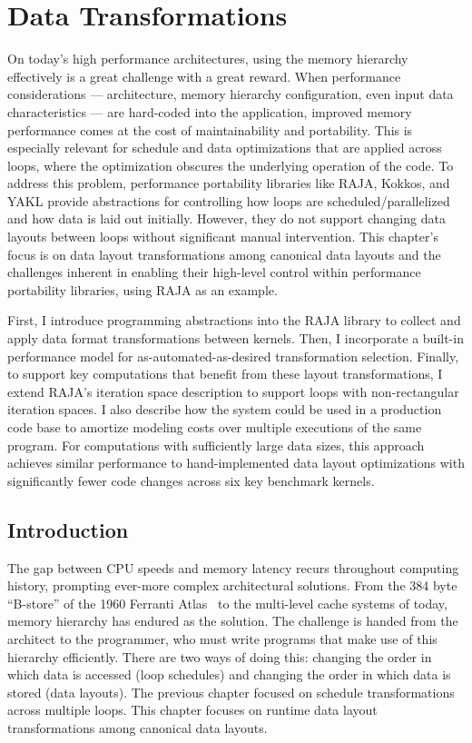 \chapter{Data Transformations}\label{chap:FormatDecisions}

On today's high performance architectures, using the memory hierarchy effectively is a great challenge with a great reward.
When performance considerations --- architecture, memory hierarchy configuration, even input data characteristics --- are hard-coded into the application, improved memory performance comes at the cost of maintainability and portability.
This is especially relevant for schedule and data optimizations that are applied across loops, where the optimization obscures the underlying operation of the code.
To address this problem, performance portability libraries like RAJA, Kokkos, and YAKL provide abstractions for controlling how loops are scheduled/parallelized and how data is laid out initially. 
However, they do not support changing data layouts between loops without significant manual intervention.
This chapter's focus is on data layout transformations among canonical data layouts and the challenges inherent in enabling their high-level control within performance portability libraries, using RAJA as an example.

First, I introduce programming abstractions into the RAJA library to collect and apply data format transformations between kernels.
Then, I incorporate a built-in performance model for as-automated-as-desired transformation selection. 
Finally, to support key computations that benefit from these layout transformations, I extend RAJA's iteration space description to support loops with non-rectangular iteration spaces.
I also describe how the system could be used in a production code base to amortize modeling costs over multiple executions of the same program.
For computations with sufficiently large data sizes, this approach achieves similar performance to hand-implemented data layout optimizations with significantly fewer code changes across six key benchmark kernels.

\section{Introduction}

The gap between CPU speeds and memory latency recurs throughout computing history, prompting ever-more complex architectural solutions.
From the 384 byte ``B-store'' of the 1960 Ferranti Atlas~\cite{ferranti1960features} to the multi-level cache systems of today, memory hierarchy has endured as the solution.
The challenge is handed from the architect to the programmer, who must write programs that make use of this hierarchy efficiently.
There are two ways of doing this: changing the order in which data is accessed (loop schedules) and changing the order in which data is stored (data layouts).
The previous chapter focused on schedule transformations across multiple loops. 
This chapter focuses on runtime data layout transformations among canonical data layouts.

